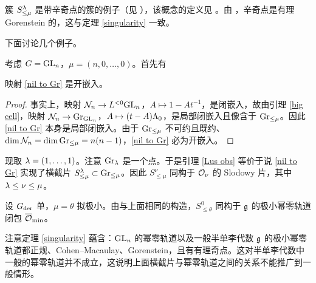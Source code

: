 \begin{rmk}\label{symplectic sing}
簇 $S^{\lambda}_{\leq \mu}$ 是带辛奇点的簇的例子（见 \cite[Theorem 2.7]{KWWY}），该概念的定义见 \cite[Definition 1.1]{Bea}。由 \cite[Proposition 1.3]{Bea}，辛奇点是有理 Gorenstein 的，这与定理 \ref{singularity} 一致。
\end{rmk}

下面讨论几个例子。

\begin{ex}\label{slice GLn}
考虑 $G={\operatorname{GL}}_n$，$\mu=(n,0,\ldots,0)$。首先有

\begin{lem}\label{Lus obs}
映射 \eqref{nil to Gr} 是开嵌入。
\end{lem}

\begin{proof}
事实上，映射 ${\mathcal N}_n\to L^{<0}{\operatorname{GL}}_n$，$A\mapsto 1-At^{-1}$，是闭嵌入，故由引理 \ref{big cell}，映射 ${\mathcal N}_n\to {\operatorname{Gr}}_{{\operatorname{GL}}_n}$，$A\mapsto (t-A){\Lambda}_0$，是局部闭嵌入且像含于 ${\operatorname{Gr}}_{\leq \mu}$。因此 \eqref{nil to Gr} 本身是局部闭嵌入。由于 ${\operatorname{Gr}}_{\leq \mu}$ 不可约且既约、$\dim {\mathcal N}_n=\dim {\operatorname{Gr}}_{\leq \mu}=n(n-1)$，\eqref{nil to Gr} 必为开嵌入。
\end{proof}

现取 ${\lambda}=(1,\ldots,1)$。注意 ${\operatorname{Gr}}_{\lambda}$ 是一个点。于是引理 \ref{Lus obs} 等价于说 \eqref{nil to Gr} 实现了横截片 $S_{\leq \mu}^{\lambda}\subset {\operatorname{Gr}}_{\leq \mu}$。因此 $S_{\leq \mu}^\nu$ 同构于 ${\mathcal O}_\nu$ 的 Slodowy 片，其中 ${\lambda}\leq \nu\leq \mu$。
\end{ex}

\begin{ex}
设 $G_{\operatorname{der}}$ 单，$\mu=\theta$ 拟极小。由与上面相同的构造，$S^0_{\leq \theta}$ 同构于 ${\mathfrak g}$ 的极小幂零轨道闭包 $\overline{{\mathcal O}}_{\operatorname{min}}$。
\end{ex}

\begin{rmk}
注意定理 \ref{singularity} 蕴含：${\operatorname{GL}}_n$ 的幂零轨道以及一般半单李代数 ${\mathfrak g}$ 的极小幂零轨道都正规、Cohen--Macaulay、Gorenstein，且有有理奇点。这对半单李代数中一般的幂零轨道并不成立，这说明上面横截片与幂零轨道之间的关系不能推广到一般情形。
\end{rmk}
